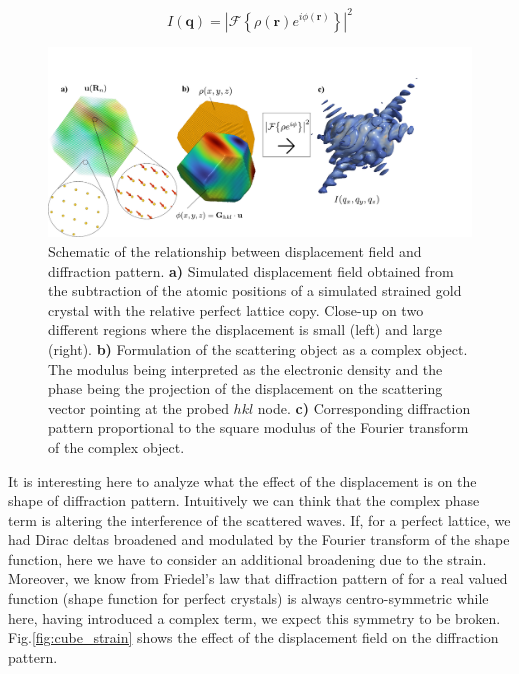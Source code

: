 \begin{equation}
    I(\mathbf q) =  \left| \mathcal{F}\!\left\{ \rho(\mathbf{r}) e^{i \phi(\mathbf{r})} \right\} \right |^2
    \label{eq:fourie_relation}
\end{equation}

\begin{figure}[H]
    \centering
    \includegraphics[width=\textwidth]{figures/Intro/displacement.pdf}
    \caption{Schematic of the relationship between displacement field and diffraction pattern. \textbf{a)} Simulated 
    displacement field obtained from the subtraction of the atomic positions of a simulated strained gold crystal with 
    the relative perfect lattice copy. Close-up on two different regions where the displacement is small (left) and large (right). 
    \textbf{b)} Formulation of the scattering object as a complex object. The modulus being interpreted as the electronic 
    density and the phase being the projection of the displacement on the scattering vector pointing at the probed $hkl$ node. 
    \textbf{c)} Corresponding diffraction pattern proportional to the square modulus of the Fourier transform of the complex object.}
    \label{fig:displacement}
\end{figure}

It is interesting here to analyze what the effect of the displacement is on the shape of diffraction pattern. Intuitively 
we can think that the complex phase term is altering the interference of the scattered waves. If, for a perfect lattice, we 
had Dirac deltas broadened and modulated by the Fourier transform of the shape function, here we have to consider an additional 
broadening due to the strain. Moreover, we know from Friedel's law \cite{Friedel} that diffraction pattern of for a real valued function (shape function 
for perfect crystals) is always centro-symmetric while here, having introduced a complex term, we expect this symmetry to be broken. 
Fig.\ref{fig:cube_strain} shows the effect of the displacement field on the diffraction pattern. 

